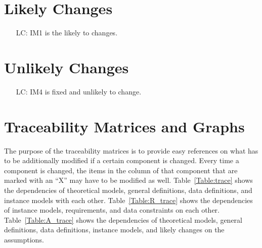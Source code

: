 \documentclass[12pt]{article}
\newcounter{lcnum} %
\begin{document}
\section{Likely Changes}    

\noindent \begin{itemize}

\item[LC\refstepcounter{lcnum}\thelcnum\label{LC_meaningfulLabel}:] IM1 is the likely to changes.

\end{itemize}

\section{Unlikely Changes}    

\noindent \begin{itemize}

\item[LC\refstepcounter{lcnum}\thelcnum\label{LC_meaningfulLabel}:] IM4 is fixed and unlikely to change.

\end{itemize}

\section{Traceability Matrices and Graphs}

The purpose of the traceability matrices is to provide easy references on what
has to be additionally modified if a certain component is changed.  Every time a
component is changed, the items in the column of that component that are marked
with an ``X'' may have to be modified as well.  Table~\ref{Table:trace} shows the
dependencies of theoretical models, general definitions, data definitions, and
instance models with each other. Table~\ref{Table:R_trace} shows the
dependencies of instance models, requirements, and data constraints on each
other. Table~\ref{Table:A_trace} shows the dependencies of theoretical models,
general definitions, data definitions, instance models, and likely changes on
the assumptions.



\newpage{}
\end{document}
